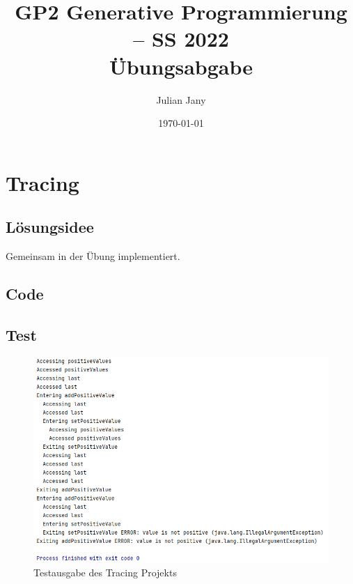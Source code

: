 \documentclass[german,notitlepage,smartquotes]{hgbreport}
\author{Julian Jany}                        %
\title{GP2 Generative Programmierung -- SS 2022\\ %
				Übungsabgabe \arabic{chapter}}
\date{\today}
\begin{document}
\maketitle



\section{Tracing}

\subsection{Lösungsidee}

Gemeinsam in der Übung implementiert.

\subsection{Code}






\clearpage

\subsection{Test}

\begin{figure}[h]
\centering
\includegraphics[width=.7\textwidth]{tracing-test-0}
\caption{Testausgabe des Tracing Projekts}
\label{fig:tracing-test-0}
\end{figure}
\end{document}

